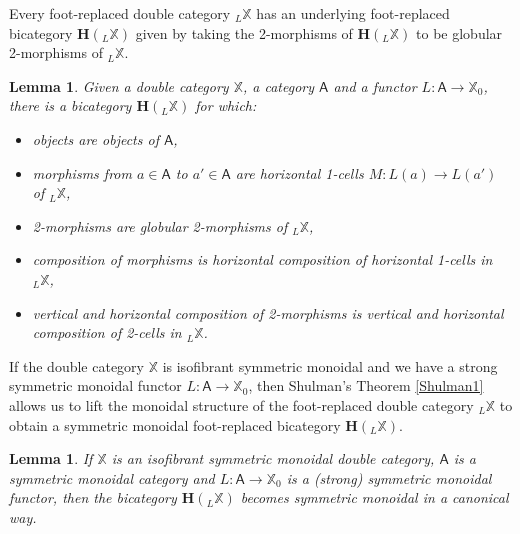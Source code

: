 \documentclass[oneside,final]{ucr}
\newtheorem{lemma}[theorem]{Lemma}
\theoremstyle{definition}
\newcommand{\maps}{\colon}
\newcommand{\A}{\mathsf{A}}
\newcommand{\lX}{\mathbb{X}}
\begin{document}
{Every foot-replaced double category $_L \lX$ has an underlying foot-replaced bicategory $\mathbf{H}( _L \lX)$ given by taking the 2-morphisms of $\mathbf{H}( _L \lX)$ to be globular 2-morphisms of $_L \lX$.

\begin{lemma}
Given a double category $\lX$, a category $\A$ and a functor $L \maps \A \to \lX_0$, there is a bicategory $\mathbf{H}(_{L} \lX)$ for which:
\begin{itemize}
\item objects are objects of $\A$,
\item morphisms from $a \in \A$ to $a' \in \A$ are horizontal 1-cells
$M \maps L(a) \to L(a')$ of $_L \lX$,
\item 2-morphisms are  globular 2-morphisms of $_L \lX$,
\item composition of morphisms is horizontal composition of horizontal 1-cells in $_L \lX$,
\item vertical and horizontal composition of 2-morphisms is vertical and horizontal
composition of 2-cells in $_L \lX$.
\end{itemize}
\end{lemma}

If the double category $\lX$ is isofibrant symmetric monoidal and we have a strong symmetric monoidal functor $L \colon \A \to \lX_0$, then Shulman's Theorem \ref{Shulman1} allows us to lift the monoidal structure of the foot-replaced double category $_L \lX$ to obtain a symmetric monoidal foot-replaced bicategory $\mathbf{H}(_L \lX)$.

\begin{lemma} \label{trick3}
If $\lX$ is an isofibrant symmetric monoidal double category, $\A$ is a symmetric monoidal
category and $L \maps \A \to \lX_0$ is a (strong) symmetric monoidal functor, then the bicategory $\mathbf{H}(_L \lX)$ becomes symmetric monoidal in a canonical way.
\end{lemma}

}
\end{document}

